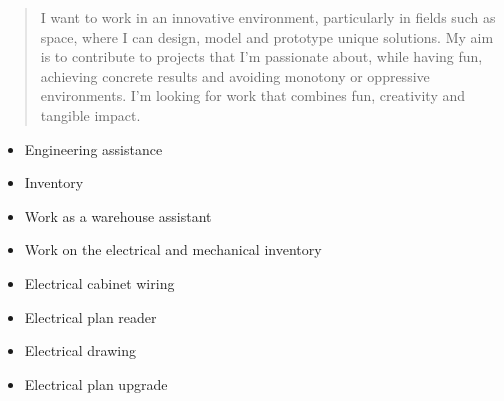 \documentclass[10pt,a4paper,ragged2e,withhyper]{altacv}
\begin{document}
\begin{paracol}{2}

\begin{quote}
\footnotesize I want to work in an innovative environment, particularly in fields such as space, where I can design, model and prototype unique solutions. My aim is to contribute to projects that I'm passionate about, while having fun, achieving concrete results and avoiding monotony or oppressive environments. I'm looking for work that combines fun, creativity and tangible impact.
\end{quote}


\begin{itemize}
\item \footnotesize Engineering assistance
\item \footnotesize Inventory
\end{itemize}

\divider

\begin{itemize}
\item \footnotesize Work as a warehouse assistant
\item \footnotesize Work on the electrical and mechanical inventory
\end{itemize}

\divider

\begin{itemize}
\item \footnotesize Electrical cabinet wiring
\item \footnotesize Electrical plan reader
\end{itemize}

\divider

\begin{itemize}
\item \footnotesize Electrical drawing 
\item \footnotesize Electrical plan upgrade
\end{itemize}


\end{paracol}
\end{document}
